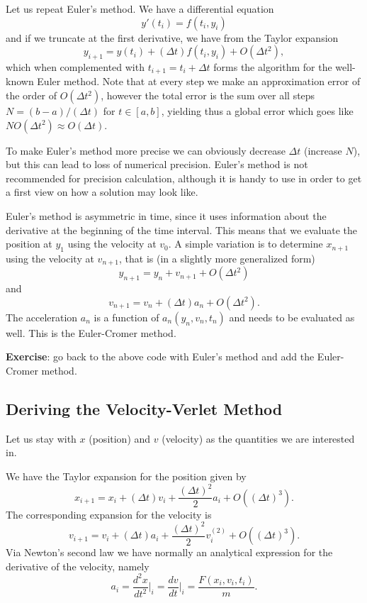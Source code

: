 \documentclass[%
oneside,                 %
final,                   %
10pt]{article}
\begin{document}
Let us repeat Euler's method.
We have a differential equation
\begin{equation}
y'(t_i)=f(t_i,y_i)   
\end{equation}
and if we truncate at the first derivative, we have from the Taylor expansion
\begin{equation}
y_{i+1}=y(t_i) + (\Delta t) f(t_i,y_i) + O(\Delta t^2), \label{eq:euler}
\end{equation}
which when complemented with $t_{i+1}=t_i+\Delta t$ forms
the algorithm for the well-known Euler method. 
Note that at every step we make an approximation error
of the order of $O(\Delta t^2)$, however the total error is the sum over all
steps $N=(b-a)/(\Delta t)$ for $t\in [a,b]$, yielding thus a global error which goes like
$NO(\Delta t^2)\approx O(\Delta t)$. 

To make Euler's method more precise we can obviously
decrease $\Delta t$ (increase $N$), but this can lead to loss of numerical precision.
Euler's method is not recommended for precision calculation,
although it is handy to use in order to get a first
view on how a solution may look like.

Euler's method is asymmetric in time, since it uses information about the derivative at the beginning
of the time interval. This means that we evaluate the position at $y_1$ using the velocity
at $v_0$. A simple variation is to determine $x_{n+1}$ using the velocity at
$v_{n+1}$, that is (in a slightly more generalized form)
\begin{equation} 
y_{n+1}=y_{n}+ v_{n+1}+O(\Delta t^2)
\end{equation}
and 
\begin{equation}
v_{n+1}=v_{n}+(\Delta t) a_{n}+O(\Delta t^2).
\end{equation}
The acceleration $a_n$ is a function of $a_n(y_n, v_n, t_n)$ and needs to be evaluated
as well. This is the Euler-Cromer method.

\textbf{Exercise}: go back to the above code with Euler's method and add the Euler-Cromer method. 

\subsection{Deriving the Velocity-Verlet Method}

Let us stay with $x$ (position) and $v$ (velocity) as the quantities we are interested in.

We have the Taylor expansion for the position given by
\[
x_{i+1} = x_i+(\Delta t)v_i+\frac{(\Delta t)^2}{2}a_i+O((\Delta t)^3).
\]
The corresponding expansion for the velocity is 
\[
v_{i+1} = v_i+(\Delta t)a_i+\frac{(\Delta t)^2}{2}v^{(2)}_i+O((\Delta t)^3).
\]
Via Newton's second law we have normally an analytical expression for the derivative of the velocity, namely
\[
a_i= \frac{d^2 x}{dt^2}\vert_{i}=\frac{d v}{dt}\vert_{i}= \frac{F(x_i,v_i,t_i)}{m}.
\]
\end{document}

